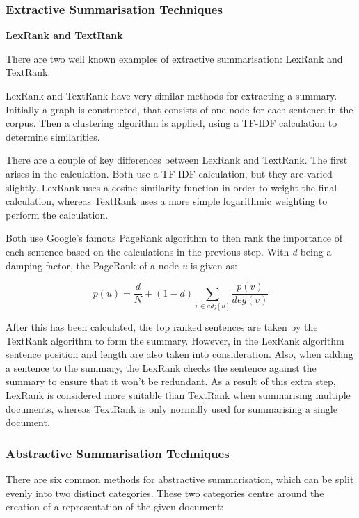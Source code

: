 \documentclass[12pt]{article}
\begin{document}
\subsubsection{Extractive Summarisation Techniques}

\label{extractiveSummarisation}

\textbf{LexRank and TextRank}

There are two well known examples of extractive summarisation: LexRank and TextRank.

LexRank and TextRank have very similar methods for extracting a summary\cite{lexRank}. Initially a graph is constructed, that consists of one node for each sentence in the corpus. Then a clustering algorithm is applied, using a TF-IDF calculation to determine similarities. 

There are a couple of key differences between LexRank and TextRank. The first arises in the calculation. Both use a TF-IDF calculation, but they are varied slightly. LexRank uses a cosine similarity function in order to weight the final calculation, whereas TextRank uses a more simple logarithmic weighting to perform the calculation. 

Both use Google's famous PageRank algorithm to then rank the importance of each sentence based on the calculations in the previous step. With \emph{d} being a damping factor, the PageRank of a node \emph{u} is given as:

\[p(u) = \frac{d}{N} + (1-d)\sum_{v \in adj[u]}\frac{p(v)}{deg(v)} \] 

After this has been calculated, the top ranked sentences are taken by the TextRank algorithm to form the summary. However, in the LexRank algorithm sentence position and length are also taken into consideration. Also, when adding a sentence to the summary, the LexRank checks the sentence against the summary to ensure that it won't be redundant. As a result of this extra step, LexRank is considered more suitable than TextRank when summarising multiple documents, whereas TextRank is only normally used for summarising a single document.

\subsubsection{Abstractive Summarisation Techniques}

\label{abstractiveSummarisation}

There are six common methods for abstractive summarisation, which can be split evenly into two distinct categories\cite{abstractiveTechniques}. These two categories centre around the creation of a representation of the given document: \\
\end{document}
